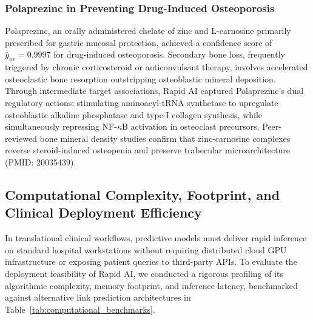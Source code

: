 \documentclass[conference,a4paper]{IEEEtran}
\begin{document}
\subsubsection{Polaprezinc in Preventing Drug-Induced Osteoporosis}
Polaprezinc, an orally administered chelate of zinc and L-carnosine primarily prescribed for gastric mucosal protection, achieved a confidence score of $\hat{y}_{uv} = 0.9997$ for drug-induced osteoporosis. Secondary bone loss, frequently triggered by chronic corticosteroid or anticonvulsant therapy, involves accelerated osteoclastic bone resorption outstripping osteoblastic mineral deposition. Through intermediate target associations, Rapid AI captured Polaprezinc's dual regulatory actions: stimulating aminoacyl-tRNA synthetase to upregulate osteoblastic alkaline phosphatase and type-I collagen synthesis, while simultaneously repressing NF-$\kappa$B activation in osteoclast precursors. Peer-reviewed bone mineral density studies confirm that zinc-carnosine complexes reverse steroid-induced osteopenia and preserve trabecular microarchitecture~\cite{ref_polaprezinc} (PMID: 20035439).

\subsection{Computational Complexity, Footprint, and Clinical Deployment Efficiency}
In translational clinical workflows, predictive models must deliver rapid inference on standard hospital workstations without requiring distributed cloud GPU infrastructure or exposing patient queries to third-party APIs. To evaluate the deployment feasibility of Rapid AI, we conducted a rigorous profiling of its algorithmic complexity, memory footprint, and inference latency, benchmarked against alternative link prediction architectures in Table~\ref{tab:computational_benchmarks}.
\end{document}
